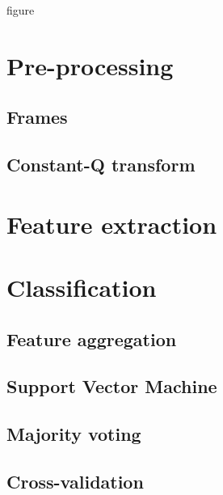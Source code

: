 {\color{red} figure}

\section{Pre-processing}

\subsection{Frames}

\subsection{Constant-Q transform}

\section{Feature extraction}

\section{Classification}

\subsection{Feature aggregation}

\subsection{Support Vector Machine}

\subsection{Majority voting}

\subsection{Cross-validation}


